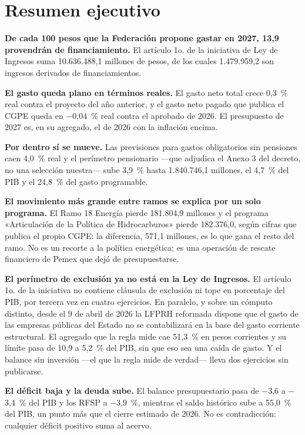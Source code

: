 \chapter*{Resumen ejecutivo}

\textbf{De cada 100 pesos que la Federación propone gastar en 2027, 13,9 provendrán de
financiamiento.} El artículo 1o. de la iniciativa de Ley de Ingresos suma 10.636.488,1
millones de pesos, de los cuales 1.479.959,2 son ingresos derivados de financiamientos.

\textbf{El gasto queda plano en términos reales.} El gasto neto total crece 0,3~\% real
contra el proyecto del año anterior, y el gasto neto pagado que publica el CGPE queda en
$-$0,04~\% real contra el aprobado de 2026. El presupuesto de 2027 es, en su agregado, el de
2026 con la inflación encima.

\textbf{Por dentro sí se mueve.} Las previsiones para gastos obligatorios sin pensiones caen
4,0~\% real y el perímetro pensionario ---que adjudica el Anexo 3 del decreto, no una
selección nuestra--- sube 3,9~\% hasta 1.840.746,1 millones, el 4,7~\% del PIB y el 24,8~\%
del gasto programable.

\textbf{El movimiento más grande entre ramos se explica por un solo programa.} El Ramo 18 Energía
pierde 181.804,9 millones y el programa «Articulación de la Política de Hidrocarburos»
pierde 182.376,0, según cifras que publica el propio CGPE: la diferencia, 571,1 millones, es
lo que gana el resto del ramo. No es un recorte a la política energética; es una operación
de rescate financiero de Pemex que dejó de presupuestarse.

\textbf{El perímetro de exclusión ya no está en la Ley de Ingresos.} El artículo 1o. de la
iniciativa no contiene cláusula de exclusión ni tope en porcentaje del PIB, por tercera vez
en cuatro ejercicios. En paralelo, y sobre un cómputo distinto, desde el 9 de abril de 2026
la LFPRH reformada dispone que el gasto de las empresas públicas del Estado no se
contabilizará en la base del gasto corriente estructural. El agregado que la regla mide cae 51,3~\% en pesos corrientes y su límite pasa
de 10,9 a 5,2~\% del PIB, sin que eso sea una caída de gasto. Y el balance sin inversión ---el
que la regla mide de verdad--- lleva dos ejercicios sin publicarse.

\textbf{El déficit baja y la deuda sube.} El balance presupuestario pasa de $-$3,6 a
$-$3,4~\% del PIB y los RFSP a $-$3,9~\%, mientras el saldo histórico sube a 55,0~\% del PIB,
un punto más que el cierre estimado de 2026. No es contradicción: cualquier déficit positivo
suma al acervo.

